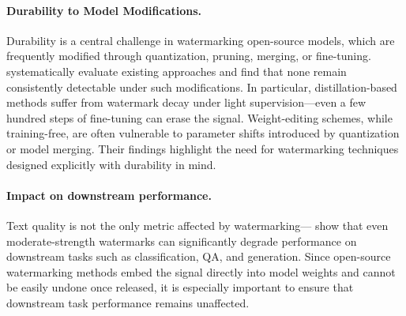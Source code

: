 \paragraph{Durability to Model Modifications.}
Durability is a central challenge in watermarking open-source models, which are frequently modified through quantization, pruning, merging, or fine-tuning. \citet{gloaguen2025towards} systematically evaluate existing approaches and find that none remain consistently detectable under such modifications.  In particular, distillation-based methods suffer from watermark decay under light supervision—even a few hundred steps of fine-tuning can erase the signal. Weight-editing schemes, while training-free, are often vulnerable to parameter shifts introduced by quantization or model merging. Their findings highlight the need for watermarking techniques designed explicitly with durability in mind.

\paragraph{Impact on downstream performance.}
Text quality is not the only metric affected by watermarking—\citet{ajith-etal-2024-downstream} show that even moderate-strength watermarks can significantly degrade performance on downstream tasks such as classification, QA, and generation. Since open-source watermarking methods embed the signal directly into model weights and cannot be easily undone once released, it is especially important to ensure that downstream task performance remains unaffected.